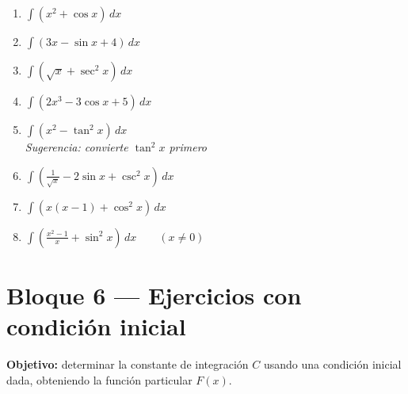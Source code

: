 \documentclass[12pt, letterpaper]{article}
\newcommand{\dx}{\,dx}
\begin{document}
\begin{enumerate}[label=\textbf{\arabic*.}, leftmargin=*, itemsep=14pt, start=59]

  \item \medio\quad
    $\displaystyle\int (x^2 + \cos x)\dx$

  \item \medio\quad
    $\displaystyle\int (3x - \sin x + 4)\dx$

  \item \medio\quad
    $\displaystyle\int \left(\sqrt{x} + \sec^2 x\right)\dx$

  \item \medio\quad
    $\displaystyle\int \left(2x^3 - 3\cos x + 5\right)\dx$

  \item \dificil\quad
    $\displaystyle\int \left(x^2 - \tan^2 x\right)\dx$\\
    \textit{Sugerencia: convierte $\tan^2 x$ primero}

  \item \dificil\quad
    $\displaystyle\int \left(\frac{1}{\sqrt{x}} - 2\sin x + \csc^2 x\right)\dx$

  \item \dificil\quad
    $\displaystyle\int \left(x(x-1) + \cos^2 x\right)\dx$

  \item \dificil\quad
    $\displaystyle\int \left(\frac{x^2 - 1}{x} + \sin^2 x\right)\dx \qquad (x\neq 0)$

\end{enumerate}

\vspace{4pt}

\section{Bloque 6 — Ejercicios con condición inicial}

\begin{cuadroinfo}
\small\textbf{Objetivo:} determinar la constante de integración $C$ usando
una condición inicial dada, obteniendo la función particular $F(x)$.
\end{cuadroinfo}

\vspace{4pt}
\end{document}

